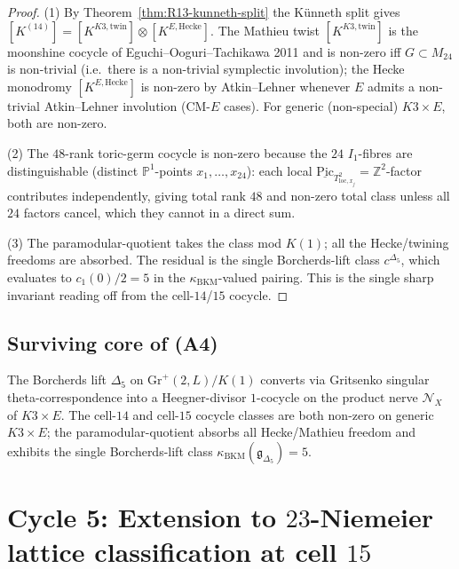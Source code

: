 \documentclass[11pt]{amsart}
\providecommand{\kBKM}{\kappa_{\mathrm{BKM}}}
\providecommand{\Z}{\mathbb{Z}}
\providecommand{\Pic}{\mathrm{Pic}}
\providecommand{\cN}{\mathcal{N}}
\begin{document}
\begin{proof}
(1) By Theorem~\ref{thm:R13-kunneth-split} the K\"{u}nneth split gives
$[K^{(14)}] = [K^{K3, \mathrm{twin}}] \otimes [K^{E, \mathrm{Hecke}}]$.
The Mathieu twist $[K^{K3, \mathrm{twin}}]$ is the moonshine cocycle of
Eguchi--Ooguri--Tachikawa 2011 and is non-zero iff $G \subset M_{24}$
is non-trivial (i.e.\ there is a non-trivial symplectic involution);
the Hecke monodromy $[K^{E, \mathrm{Hecke}}]$ is non-zero by
Atkin--Lehner whenever $E$ admits a non-trivial Atkin--Lehner
involution (CM-$E$ cases). For generic (non-special) $K3 \times E$,
both are non-zero.

(2) The $48$-rank toric-germ cocycle is non-zero because the $24$
$I_1$-fibres are distinguishable (distinct $\mathbb{P}^1$-points
$x_1, \ldots, x_{24}$): each local $\underline{\Pic}_{T^2_{\mathrm{loc},
x_j}} = \Z^2$-factor contributes independently, giving total rank
$48$ and non-zero total class unless all $24$ factors cancel, which
they cannot in a direct sum.

(3) The paramodular-quotient takes the class mod $K(1)$; all the
Hecke/twining freedoms are absorbed. The residual is the single
Borcherds-lift class $c^{\Delta_5}$, which evaluates to $c_1(0)/2 = 5$
in the $\kBKM$-valued pairing. This is the single sharp invariant
reading off from the cell-$14$/$15$ cocycle.
\end{proof}

\subsection*{Surviving core of (A4)}

The Borcherds lift $\Delta_5$ on $\mathrm{Gr}^+(2, L) / K(1)$ converts
via Gritsenko singular theta-correspondence into a Heegner-divisor
$1$-cocycle on the product nerve $\cN_X$ of $K3 \times E$. The
cell-$14$ and cell-$15$ cocycle classes are both non-zero on generic
$K3 \times E$; the paramodular-quotient absorbs all Hecke/Mathieu
freedom and exhibits the single Borcherds-lift class
$\kBKM(\mathfrak{g}_{\Delta_5}) = 5$.

\section{Cycle 5: Extension to $23$-Niemeier lattice classification at cell $15$}
\end{document}
